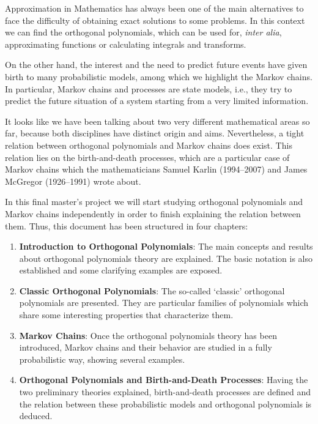 
Approximation in Mathematics has always been one of the main alternatives to face the difficulty of obtaining exact solutions to some problems. In this context we can find the orthogonal polynomials, which can be used for, \textit{inter alia}, approximating functions or calculating integrals and transforms.

On the other hand, the interest and the need to predict future events have given birth to many probabilistic models, among which we highlight the Markov chains. In particular, Markov chains and processes are state models, i.e., they try to predict the future situation of a system starting from a very limited information.

It looks like we have been talking about two very different mathematical areas so far, because both disciplines have distinct origin and aims. Nevertheless, a tight relation between orthogonal polynomials and Markov chains does exist. This relation lies on the birth-and-death processes, which are a particular case of Markov chains which the mathematicians Samuel Karlin (1994--2007) and James McGregor (1926--1991) wrote about.

In this final master's project we will start studying orthogonal polynomials and Markov chains independently in order to finish explaining the relation between them. Thus, this document has been structured in four chapters: 

\begin{enumerate}
    \item \textbf{Introduction to Orthogonal Polynomials}: The main concepts and results about orthogonal polynomials theory are explained. The basic notation is also established and some clarifying examples are exposed.
    \item \textbf{Classic Orthogonal Polynomials}: The so-called `classic' orthogonal polynomials are presented. They are particular families of polynomials which share some interesting properties that characterize them.
    \item \textbf{Markov Chains}: Once the orthogonal polynomials theory has been introduced, Markov chains and their behavior are studied in a fully probabilistic way, showing several examples.
    \item \textbf{Orthogonal Polynomials and Birth-and-Death Processes}: Having the two preliminary theories explained, birth-and-death processes are defined and the relation between these probabilistic models and orthogonal polynomials is deduced.
\end{enumerate}

